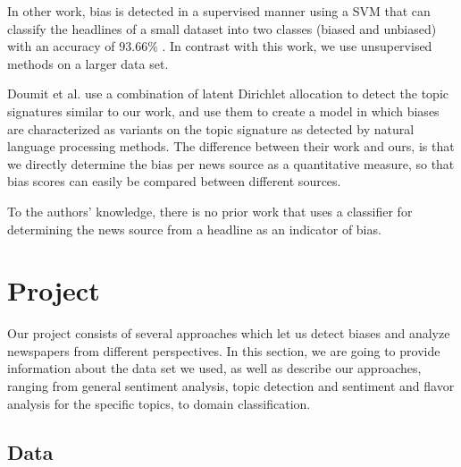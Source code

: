 \documentclass[final]{ieee}
\begin{document}
In other work, bias is detected in a supervised manner using a SVM that can classify the headlines of a small dataset into two classes (biased and unbiased) with an accuracy of $93.66\%$ \cite{CHU}. In contrast with this work, we use unsupervised methods on a larger data set.

Doumit et al. \cite{DOUMIT11} use a combination of latent Dirichlet allocation to detect the topic signatures similar to our work, and use them to create a model in which biases are characterized as variants on the topic signature as detected by natural language processing methods. The difference between their work and ours, is that we directly determine the bias per news source as a quantitative measure, so that bias scores can easily be compared between different sources.

To the authors' knowledge, there is no prior work that uses a classifier for determining the news source from a headline as an indicator of bias.

%            
%


\section{Project}\label{sec:project}

Our project consists of several approaches which let us detect biases and analyze newspapers from different perspectives. In this section, we are going to provide information about the data set we used, as well as describe our approaches, ranging from general sentiment analysis, topic detection and sentiment and flavor analysis for the specific topics, to domain classification.

\subsection{Data}\label{sec:data}
\end{document}

